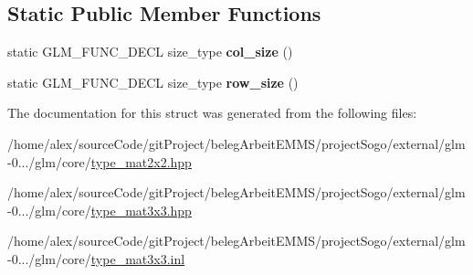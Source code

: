 \subsection*{Static Public Member Functions}
\begin{DoxyCompactItemize}
\item 
\hypertarget{structglm_1_1detail_1_1tmat3x3_adad00b6048cfb901455278d9d4576945}{static G\-L\-M\-\_\-\-F\-U\-N\-C\-\_\-\-D\-E\-C\-L size\-\_\-type {\bfseries col\-\_\-size} ()}\label{structglm_1_1detail_1_1tmat3x3_adad00b6048cfb901455278d9d4576945}

\item 
\hypertarget{structglm_1_1detail_1_1tmat3x3_ae33289a56bcabdb12eebac93ebebf5f3}{static G\-L\-M\-\_\-\-F\-U\-N\-C\-\_\-\-D\-E\-C\-L size\-\_\-type {\bfseries row\-\_\-size} ()}\label{structglm_1_1detail_1_1tmat3x3_ae33289a56bcabdb12eebac93ebebf5f3}

\end{DoxyCompactItemize}


The documentation for this struct was generated from the following files\-:\begin{DoxyCompactItemize}
\item 
/home/alex/source\-Code/git\-Project/beleg\-Arbeit\-E\-M\-M\-S/project\-Sogo/external/glm-\/0.../glm/core/\hyperlink{type__mat2x2_8hpp}{type\-\_\-mat2x2.\-hpp}\item 
/home/alex/source\-Code/git\-Project/beleg\-Arbeit\-E\-M\-M\-S/project\-Sogo/external/glm-\/0.../glm/core/\hyperlink{type__mat3x3_8hpp}{type\-\_\-mat3x3.\-hpp}\item 
/home/alex/source\-Code/git\-Project/beleg\-Arbeit\-E\-M\-M\-S/project\-Sogo/external/glm-\/0.../glm/core/\hyperlink{type__mat3x3_8inl}{type\-\_\-mat3x3.\-inl}\end{DoxyCompactItemize}
